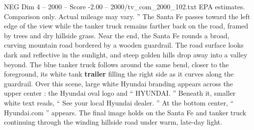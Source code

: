 \begin{textsample}{NEG Dim 4 – 2000 – Score -2.00 – 2000/tv\_com\_2000\_102.txt}
EPA estimates.
Comparison only.
Actual mileage may vary. ” The Santa Fe passes toward the left edge of the view while the tanker truck remains farther back on the road, framed by trees and dry hillside grass.
Near the end, the Santa Fe rounds a broad, curving mountain road bordered by a wooden guardrail.
The road surface looks dark and reflective in the sunlight, and steep golden hills drop away into a valley beyond.
The blue tanker truck follows around the same bend, closer to the foreground, its white tank \textbf{trailer} filling the right side as it curves along the guardrail.
Over this scene, large white Hyundai branding appears across the upper center : the Hyundai oval logo and “ HYUNDAI. ” Beneath it, smaller white text reads, “ See your local Hyundai dealer. ” At the bottom center, “ Hyundai.com ” appears.
The final image holds on the Santa Fe and tanker truck continuing through the winding hillside road under warm, late-day light.

\end{textsample}
